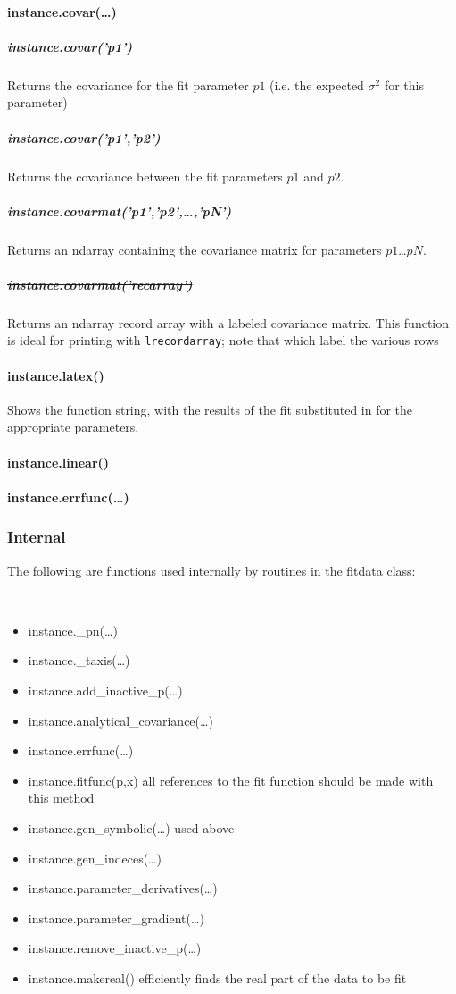 \paragraph{instance.covar(\ldots)}
\subparagraph{instance.covar('p1')}
Returns the covariance for the fit parameter $p1$
    (i.e. the expected $\sigma^2$ for this parameter)
\subparagraph{instance.covar('p1','p2')}
Returns the covariance between the fit parameters $p1$ and $p2$.
\subparagraph{instance.covarmat('p1','p2',\ldots,'pN')}
Returns an ndarray containing the covariance matrix for parameters $p1$\ldots$pN$.
\subparagraph{\sout{ instance.covarmat('recarray') } }
Returns an ndarray record array with
    a labeled covariance matrix.
This function is ideal
    for printing with {\tt lrecordarray};
    note that 
    which label the various rows
\paragraph{instance.latex()}
Shows the function string,
    with the results of the fit substituted in for the
    appropriate parameters.
\paragraph{instance.linear()}
\paragraph{instance.errfunc(\ldots)}
\subsubsection{Internal}
The following are functions used internally by routines in the fitdata class:
{\tt
\begin{itemize}
    \item instance.\_pn(\ldots) 
    \item instance.\_taxis(\ldots) 
    \item instance.add\_inactive\_p(\ldots)
    \item instance.analytical\_covariance(\ldots)
    \item instance.errfunc(\ldots) 
    \item instance.fitfunc(p,x) {\rm all references to the fit function should be made with this method}
    \item instance.gen\_symbolic(\ldots)
        {\rm used above}
    \item instance.gen\_indeces(\ldots)
    \item instance.parameter\_derivatives(\ldots)
    \item instance.parameter\_gradient(\ldots)
    \item instance.remove\_inactive\_p(\ldots)
    \item instance.makereal() {\rm efficiently finds the real part of the data to be fit}
\end{itemize}
}
